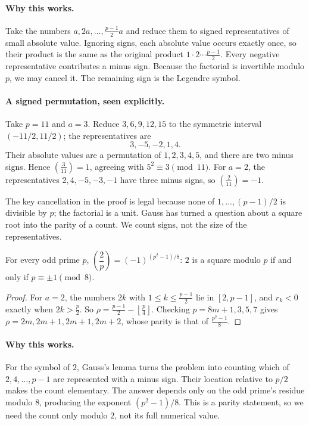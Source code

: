 \paragraph{Why this works.}
Take the numbers $a,2a,\ldots,\frac{p-1}{2}a$ and reduce them to signed representatives of small absolute value. Ignoring signs, each absolute value occurs exactly once, so their product is the same as the original product $1\cdot2\cdots\frac{p-1}{2}$. Every negative representative contributes a minus sign. Because the factorial is invertible modulo $p$, we may cancel it. The remaining sign is the Legendre symbol.

\paragraph{A signed permutation, seen explicitly.}
Take $p=11$ and $a=3$. Reduce $3,6,9,12,15$ to the symmetric interval
$(-11/2,11/2)$; the representatives are
\[
 3,-5,-2,1,4.
\]
Their absolute values are a permutation of $1,2,3,4,5$, and there are two
minus signs. Hence $\left(\frac3{11}\right)=1$, agreeing with
$5^2\equiv3\pmod{11}$. For $a=2$, the representatives
$2,4,-5,-3,-1$ have three minus signs, so
$\left(\frac2{11}\right)=-1$.

The key cancellation in the proof is legal because none of
$1,\dots,(p-1)/2$ is divisible by $p$; the factorial is a unit.
Gauss has turned a question about a square root into the parity of a count.
We count signs, not the size of the representatives.

\begin{corollary}\label{cor:two}
For every odd prime $p$,
$\left(\dfrac2p\right)=(-1)^{(p^2-1)/8}$: $2$ is a square modulo $p$ if and only if $p\equiv\pm1\pmod8$.
\end{corollary}
\begin{proof}
For $a=2$, the numbers $2k$ with $1\le k\le\frac{p-1}2$ lie in $[2,p-1]$, and $r_k<0$ exactly when $2k>\frac p2$. So $\rho=\frac{p-1}2-\left\lfloor\frac p4\right\rfloor$. Checking $p=8m+1,3,5,7$ gives $\rho=2m,2m+1,2m+1,2m+2$, whose parity is that of $\frac{p^2-1}8$.
\end{proof}

\paragraph{Why this works.}
For the symbol of $2$, Gauss's lemma turns the problem into counting which of $2,4,\ldots,p-1$ are represented with a minus sign. Their location relative to $p/2$ makes the count elementary. The answer depends only on the odd prime's residue modulo $8$, producing the exponent $(p^2-1)/8$. This is a parity statement, so we need the count only modulo $2$, not its full numerical value.

